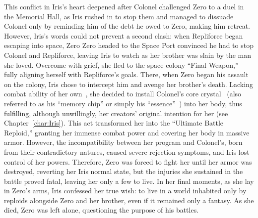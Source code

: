 This conflict in Iris’s heart deepened after Colonel challenged Zero to a duel in the Memorial Hall, as Iris rushed in to stop them and managed to dissuade Colonel only by reminding him of the debt he owed to Zero, making him retreat. However, Iris’s words could not prevent a second clash: when Repliforce began escaping into space, Zero Zero headed to the Space Port convinced he had to stop Colonel and Repliforce, leaving Iris to watch as her brother was slain by the man she loved. Overcome with grief, she fled to the space colony ``Final Weapon,'' fully aligning herself with Repliforce’s goals. There, when Zero began his assault on the colony, Iris chose to intercept him and avenge her brother’s death. Lacking combat ability of her own~\cite{wayback:X4_resources}, she decided to install Colonel’s core crystal~\cite{wiki:Iris} (also referred to as his ``memory chip'' or simply his ``essence''~\cite{wayback:X4_resources,book:MH_field_guide}) into her body, thus fulfilling, although unwillingly, her creators’ original intention for her (see Chapter~\ref{char:Iris}). This act transformed her into the ``Ultimate Battle Reploid,'' granting her immense combat power and covering her body in massive armor. However, the incompatibility between her program and Colonel’s, born from their contradictory natures, caused severe rejection symptoms, and Iris lost control of her powers. Therefore, Zero was forced to fight her until her armor was destroyed, reverting her Iris normal state, but the injuries she sustained in the battle proved fatal, leaving her only a few to live. In her final moments, as she lay in Zero’s arms, Iris confessed her true wish: to live in a world inhabited only by reploids alongside Zero and her brother, even if it remained only a fantasy. As she died, Zero was left alone, questioning the purpose of his battles.

